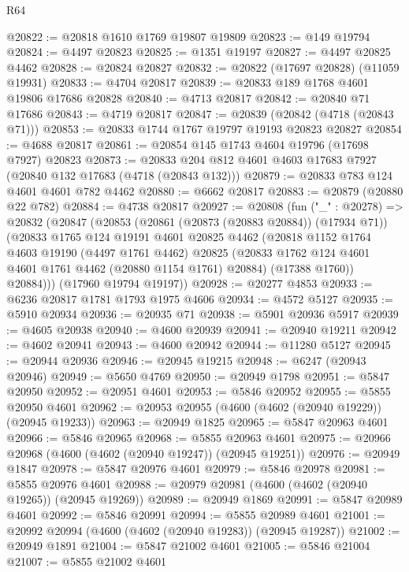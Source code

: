 \begin{lexlean}{R64}
\begin{coremodule}
@20822 := @20818 @1610 @1769 @19807 @19809
@20823 := @149 @19794
@20824 := @4497 @20823
@20825 := @1351 @19197
@20827 := @4497 @20825 @4462
@20828 := @20824 @20827
@20832 := @20822 (@17697 @20828) (@11059 @19931)
@20833 := @4704 @20817
@20839 := @20833 @189 @1768 @4601 @19806 @17686 @20828
@20840 := @4713 @20817
@20842 := @20840 @71 @17686
@20843 := @4719 @20817
@20847 := @20839 (@20842 (@4718 (@20843 @71)))
@20853 := @20833 @1744 @1767 @19797 @19193 @20823 @20827
@20854 := @4688 @20817
@20861 := @20854 @145 @1743 @4604 @19796 (@17698 @7927) @20823
@20873 := @20833 @204 @812 @4601 @4603 @17683 @7927 (@20840 @132 @17683 (@4718 (@20843 @132)))
@20879 := @20833 @783 @124 @4601 @4601 @782 @4462
@20880 := @6662 @20817
@20883 := @20879 (@20880 @22 @782)
@20884 := @4738 @20817
@20927 := @20808
    (fun ("_" : @20278) =>
    @20832
      (@20847
        (@20853
          (@20861 (@20873 (@20883 @20884)) (@17934 @71))
          (@20833
            @1765
            @124
            @19191
            @4601
            @20825
            @4462
            (@20818
              @1152
              @1764
              @4603
              @19190
              (@4497 @1761 @4462)
              @20825
              (@20833 @1762 @124 @4601 @4601 @1761 @4462 (@20880 @1154 @1761) @20884)
              (@17388 @1760))
            @20884)))
      (@17960 @19794 @19197))
@20928 := @20277 @4853
@20933 := @6236 @20817 @1781 @1793 @1975 @4606
@20934 := @4572 @5127
@20935 := @5910 @20934
@20936 := @20935 @71
@20938 := @5901 @20936 @5917
@20939 := @4605 @20938
@20940 := @4600 @20939
@20941 := @20940 @19211
@20942 := @4602 @20941
@20943 := @4600 @20942
@20944 := @11280 @5127
@20945 := @20944 @20936
@20946 := @20945 @19215
@20948 := @6247 (@20943 @20946)
@20949 := @5650 @4769
@20950 := @20949 @1798
@20951 := @5847 @20950
@20952 := @20951 @4601
@20953 := @5846 @20952
@20955 := @5855 @20950 @4601
@20962 := @20953 @20955 (@4600 (@4602 (@20940 @19229)) (@20945 @19233))
@20963 := @20949 @1825
@20965 := @5847 @20963 @4601
@20966 := @5846 @20965
@20968 := @5855 @20963 @4601
@20975 := @20966 @20968 (@4600 (@4602 (@20940 @19247)) (@20945 @19251))
@20976 := @20949 @1847
@20978 := @5847 @20976 @4601
@20979 := @5846 @20978
@20981 := @5855 @20976 @4601
@20988 := @20979 @20981 (@4600 (@4602 (@20940 @19265)) (@20945 @19269))
@20989 := @20949 @1869
@20991 := @5847 @20989 @4601
@20992 := @5846 @20991
@20994 := @5855 @20989 @4601
@21001 := @20992 @20994 (@4600 (@4602 (@20940 @19283)) (@20945 @19287))
@21002 := @20949 @1891
@21004 := @5847 @21002 @4601
@21005 := @5846 @21004
@21007 := @5855 @21002 @4601

\end{coremodule}
\end{lexlean}
